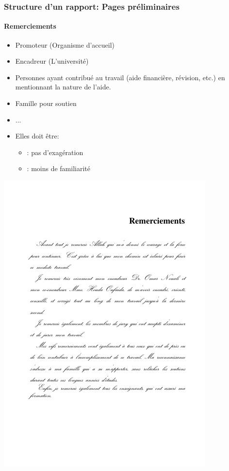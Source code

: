 \documentclass[xcolor=table]{beamer}
\begin{document}
\begin{frame}
\end{frame}

\begin{frame}
\frametitle{Structure d'un rapport: Pages préliminaires}
\framesubtitle{Remerciements}

\begin{minipage}{0.52\textwidth}
	\begin{itemize}
		\item Promoteur (Organisme d'accueil)
		\item Encadreur (L'université)
		\item Personnes ayant contribué au travail (aide financière, révision, etc.) en mentionnant la nature de l'aide.
		\item Famille pour soutien
		\item ...
		\item Elles doit être:
		\begin{itemize}
			\item {}: pas d'exagération
			\item {}: moins de familiarité
		\end{itemize}
	\end{itemize}
\end{minipage}
\begin{minipage}{0.42\textwidth}
	\includegraphics[width=\textwidth]{..//img/Bweb03-redaction/remerciements.png}
\end{minipage}

\end{frame}
\end{document}
